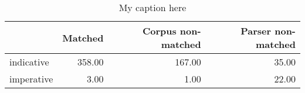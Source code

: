 \begin{table}[!ht]
\centering
\begin{tabular}{lrrr}
\toprule
{} &  Matched &  Corpus non-matched &  Parser non-matched \\
\midrule
indicative &   358.00 &              167.00 &               35.00 \\
imperative &     3.00 &                1.00 &               22.00 \\
\bottomrule
\end{tabular}
\caption{My caption here}
\label{tab:MOOD-ocd-data}
\end{table}